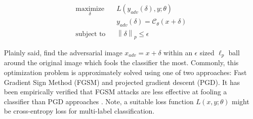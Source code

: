\documentclass[twoside]{article}
\theoremstyle{definition}
\newcommand{\norm}[2]{\left\lVert #1 \right\rVert_{#2}}
\begin{document}
\begin{problem}
    \begin{equation*}
    \begin{aligned}
    & \underset{\delta}{\text{maximize}}
    & & L(y_{adv}(\delta),y;\theta) \\
    &
    & & y_{adv}(\delta) = \mathcal{C}_{\theta}(x + \delta) \\
    & \text{subject to}
    & & \norm{\delta}{p} \leq \epsilon
    \end{aligned}
    \end{equation*}
\end{problem}

Plainly said, find the adversarial image $x_{adv} = x + \delta$ within an $\epsilon$ sized $\ell_p$ ball around the
original image which fools the classifier the most. Commonly, this optimization problem is approximately solved using
one of two approaches: Fast Gradient Sign Method (FGSM) and projected gradient descent (PGD). It has been empirically
verified that FGSM attacks are less effective at fooling a classifier than PGD approaches \cite{madry}. Note, a suitable
loss function $L(x,y;\theta)$ might be cross-entropy loss for multi-label classification. 
\end{document}
